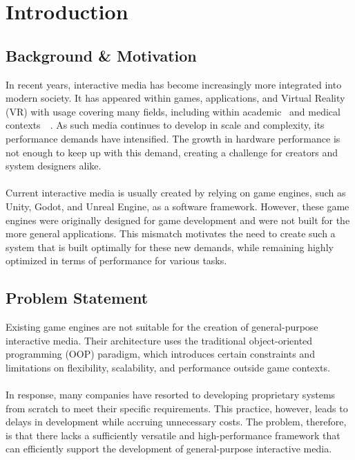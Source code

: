 \section{Introduction}
\label{sec:introduction}

\subsection{Background \& Motivation}
\label{subsec:background-and-motivation}

In recent years, interactive media has become increasingly more integrated into modern society.
It has appeared within games, applications, and Virtual Reality (VR) with usage covering
many fields, including within academic~\cite{interactive_media_learning} and medical contexts~\cite{interactive_media_medical}~\cite{VR_Rehab}.
As such media continues to develop in scale and complexity, its performance demands have intensified.
The growth in hardware performance is not enough to keep up with this demand, creating a challenge for
creators and system designers alike.
\\\\
Current interactive media is usually created by relying on game engines, such as Unity, Godot, and Unreal Engine,
as a software framework.
However, these game engines were originally designed for game development and were not built for the more
general applications.
This mismatch motivates the need to create such a system that is built optimally for these new demands,
while remaining highly optimized in terms of performance for various tasks.

\subsection{Problem Statement}
\label{subsec:problem-statement}

Existing game engines are not suitable for the creation of general-purpose interactive media.
Their architecture uses the traditional object-oriented programming (OOP) paradigm, which introduces
certain constraints and limitations on flexibility, scalability, and performance outside game contexts.
\\\\
In response, many companies have resorted to developing proprietary systems from scratch to meet their specific requirements.
This practice, however, leads to delays in development while accruing unnecessary costs.
The problem, therefore, is that there lacks a sufficiently versatile and high-performance framework that can
efficiently support the development of general-purpose interactive media.

